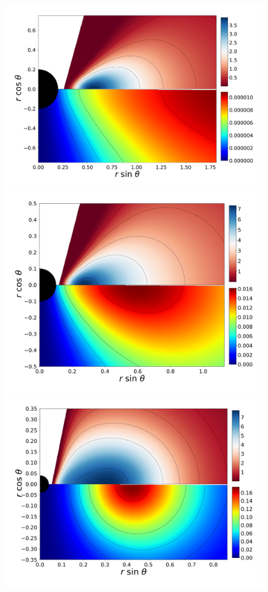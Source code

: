 \documentclass[twocolumn,aps,showpacs,showkeys,prd,superscriptaddress,byrevtex, amsmath]{revtex4-1}
\begin{document}
\begin{figure}
\centering
\includegraphics[scale=0.12]{figures/fig5_I_10.pdf}
\hspace{-0.3cm}
\includegraphics[scale=0.12]{figures/fig5_IV_10.pdf}
\hspace{-0.3cm}
\includegraphics[scale=0.12]{figures/fig5_VII_10.pdf}

\end{figure}
\end{document}
